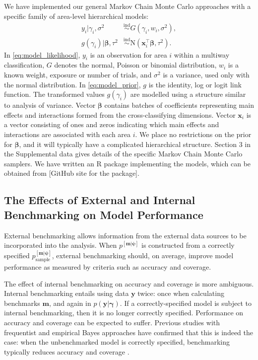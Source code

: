 \documentclass[12pt]{article}
\newcommand{\ind}{\stackrel{\text{ind}}{\sim}}
\begin{document}
We have implemented our general Markov Chain Monte Carlo approaches with a specific family of area-level hierarchical models:
\begin{align}
  y_i|\gamma_i,\sigma^2 & \ind G( \gamma_i, w_i, \sigma^2), \label{eq:model_likelihood} \\
  g(\gamma_i)|\bm{\beta},\tau^2 & \ind \text{N}\left( \bm{x}_i^{\top} \bm{\beta}, \tau^2 \right). \label{eq:model_prior}
\end{align}
In \eqref{eq:model_likelihood}, $y_i$ is an observation for area $i$ within a multiway classification, $G$ denotes the normal, Poisson or binomial distribution, $w_i$ is a known weight, exposure or number of trials, and $\sigma^2$ is a variance, used only with the normal distribution. In \eqref{eq:model_prior}, $g$ is the identity, log or logit link function.  The transformed values $g(\gamma_i)$ are modelled using a structure similar to analysis of variance.  Vector $\bm{\beta}$ contains batches of coefficients representing main effects and interactions formed from the cross-classifying dimensions.  Vector $\bm{x}_i$ is a vector consisting of ones and zeros indicating which main effects and interactions are associated with each area $i$.  We place no restrictions on the prior for $\bm{\beta}$, and it will typically have a complicated hierarchical structure. Section 3 in the Supplemental data gives details of the specific Markov Chain Monte Carlo samplers. We have written an R package implementing the models, which can be obtained from [GitHub site for the package].

\subsection{The Effects of External and Internal Benchmarking on Model Performance}\label{sec:performance}

 External benchmarking allows information from the external data sources to be incorporated into the analysis.  When $p^{[\bm{m}|\bm{\psi}]}$ is constructed from a correctly specified $p^{[\bm{m}|\bm{\psi}]}_{\text{sample}}$, external benchmarking should, on average, improve model performance as measured by criteria such as accuracy and coverage.

The effect of internal benchmarking on accuracy and coverage is more ambiguous.  Internal benchmarking entails using data $\bm{y}$ twice: once when calculating benchmarks $\bm{m}$, and again in $p(\bm{y}|\bm{\gamma})$. If a correctly-specified model is subject to internal benchmarking, then it is no longer correctly specified.  Performance on accuracy and coverage can be expected to suffer.  Previous studies with frequentist and empirical Bayes approaches have confirmed that this is indeed the case: when the unbenchmarked model is correctly specified, benchmarking typically reduces accuracy and coverage \citep{pfeffermann1991some,wang2008small,datta2011bayesian,bell2013benchmarking}.
\end{document}
